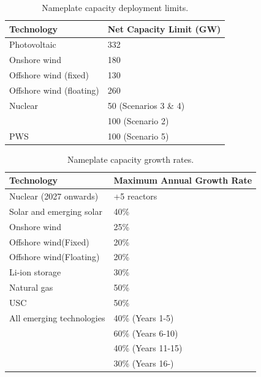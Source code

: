 


\begin{table}[H]
\centering
	\caption{Nameplate capacity deployment limits.}
	\vspace{0.1in}
	\begin{tabularx}{0.7\textwidth}{p{} p{} }
		\hline
\textbf{Technology} & \textbf{Net Capacity} \textbf{Limit} (GW)\\
\hline
Photovoltaic \cite{isep_53_2018} & 332 \\
Onshore wind \cite{heger_wind_2016,kato_energy_2016} & 180 \\
Offshore wind (fixed) \cite{heger_wind_2016,kato_energy_2016}& 130 \\
Offshore wind (floating) \cite{heger_wind_2016,kato_energy_2016}& 260 \\
Nuclear & 50 (Scenarios 3 \& 4) \\
 & 100 (Scenario 2) \\
\gls{PWS} \cite{pinaud_technical_2013} & 100 (Scenario 5) \\
\hline 
\end{tabularx}
\label{caplim}
\end{table}

\begin{table}[H]
\centering
	\caption{Nameplate capacity growth rates.}
	\vspace{0.1in}
	\begin{tabularx}{0.8\textwidth}{p{} p{}}
		\hline
\textbf{Technology} & \textbf{Maximum Annual Growth Rate} \\
\hline
Nuclear (2027 onwards) & +5 reactors \\
Solar and emerging solar \cite{irena_renewable_2020} & 40\%  \\
Onshore wind \cite{irena_renewable_2020} & 25\% \\
Offshore wind(Fixed) \cite{irena_renewable_2020} & 20\% \\
Offshore wind(Floating) \cite{irena_renewable_2020} & 20\% \\
Li-ion storage & 30\% \\
Natural gas &  50\% \\
\gls{USC} & 50\% \\
All emerging technologies & 40\% (Years 1-5) \\
& 60\% (Years 6-10) \\
 & 40\% (Years 11-15) \\
 & 30\% (Years 16-) \\
\hline 
\end{tabularx}
\label{growrate}
\end{table}

